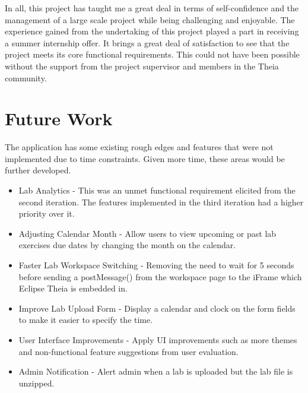 \documentclass{l4proj}
\begin{document}
In all, this project has taught me a great deal in terms of self-confidence and the management of a large scale project while being challenging and enjoyable. The experience gained from the undertaking of this project played a part in receiving a summer internship offer. It brings a great deal of satisfaction to see that the project meets its core functional requirements. This could not have been possible without the support from the project supervisor and members in the Theia community. 

\section{Future Work}

The application has some existing rough edges and features that were not implemented due to time constraints. Given more time, these areas would be further developed.

\begin{itemize}
    \item
    Lab Analytics - This was an unmet functional requirement elicited from the second iteration. The features implemented in the third iteration had a higher priority over it.
    \item 
    Adjusting Calendar Month - Allow users to view upcoming or past lab exercises due dates by changing the month on the calendar. 
    \item 
    Faster Lab Workspace Switching - Removing the need to wait for 5 seconds before sending a postMessage() from the workspace page to the iFrame which Eclipse Theia is embedded in. 
    \item
    Improve Lab Upload Form - Display a calendar and clock on the form fields to make it easier to specify the time.
    \item
    User Interface Improvements - Apply UI improvements such as more themes and non-functional feature suggestions from user evaluation.
    \item
    Admin Notification - Alert admin when a lab is uploaded but the lab file is unzipped.
    
\end{itemize}


%
% 
\end{document}

